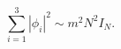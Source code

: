 \begin{equation}
\sum_{i=1}^3 \left| \phi_i \right|^2 \sim m^2 N^2 I_{N}.
\label{fuzzy}
\end{equation}

